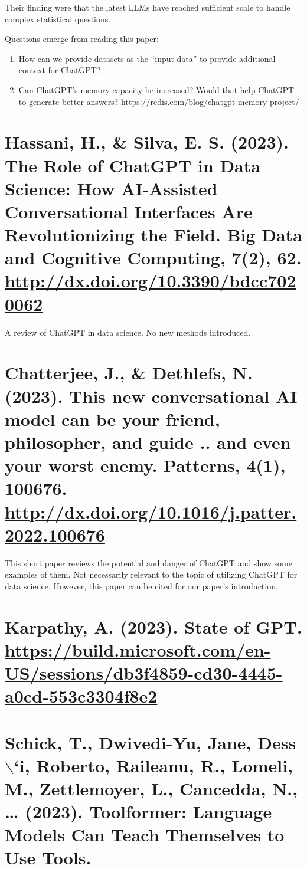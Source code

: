 \documentclass[11pt]{article}
\begin{document}
Their finding were that the latest LLMs have reached sufficient scale to handle
complex statistical questions.

Questions emerge from reading this paper:
\begin{enumerate}
\item How can we provide datasets as the ``input data'' to provide additional context
for ChatGPT?
\item Can ChatGPT's memory capacity be increased? Would that help ChatGPT to
generate better answers? \url{https://redis.com/blog/chatgpt-memory-project/}
\end{enumerate}

\section{Hassani, H., \& Silva, E. S. (2023). The Role of ChatGPT in Data Science: How AI-Assisted Conversational Interfaces Are Revolutionizing the Field. Big Data and Cognitive Computing, 7(2), 62. \url{http://dx.doi.org/10.3390/bdcc7020062}}
\label{sec:orgb9018ee}
A review of ChatGPT in data science. No new methods introduced.

\section{Chatterjee, J., \& Dethlefs, N. (2023). This new conversational AI model can be your friend, philosopher, and guide .. and even your worst enemy. Patterns, 4(1), 100676. \url{http://dx.doi.org/10.1016/j.patter.2022.100676}}
\label{sec:org14e6eba}
This short paper reviews the potential and danger of ChatGPT and show some
examples of them. Not necessarily relevant to the topic of utilizing ChatGPT for
data science. However, this paper can be cited for our paper's introduction.

\section{Karpathy, A. (2023). State of GPT. \url{https://build.microsoft.com/en-US/sessions/db3f4859-cd30-4445-a0cd-553c3304f8e2}}
\label{sec:orgb913feb}

\section{Schick, T., Dwivedi-Yu, Jane, Dess$\backslash$`i, Roberto, Raileanu, R., Lomeli, M., Zettlemoyer, L., Cancedda, N., … (2023). Toolformer: Language Models Can Teach Themselves to Use Tools.}
\label{sec:org743c2e3}
\end{document}

